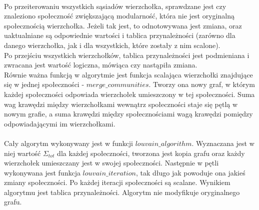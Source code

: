 \documentclass{article}
\begin{document}
\\
Po przeiterowaniu wszystkich sąsiadów wierzchołka, sprawdzane jest czy znaleziono społeczność zwiększającą modularność, która nie jest oryginalną społecznością wierzchołka. Jeżeli tak jest, to odnotowywana jest zmiana, oraz uaktualniane są odpowiednie wartości i tablica przynależności (zarówno dla danego wierzchołka, jak i dla wszystkich, które zostały z nim scalone).
\\
Po przejściu wszystkich wierzchołków, tablica przynależności jest podmieniana i zwracana jest wartość logiczna, mówiąca czy nastąpiła zmiana.  
\\
Równie ważna funkcją w algorytmie jest funkcja scalająca wierzchołki znajdujące się w jednej społeczności - $merge\_ communities$. Tworzy ona nowy graf, w którym każdej społeczności odpowiada wierzchołek umieszczony w tej społeczności. Suma wag krawędzi między wierzchołkami wewnątrz społeczności staje się pętlą w nowym grafie, a suma krawędzi między społecznościami wagą krawędzi pomiędzy odpowiadającymi im wierzchołkami.
\\ \\
Cały algorytm wykonywany jest w funkcji $louvain\_ algorithm$. Wyznaczana jest w niej wartość $\Sigma_{tot}$ dla każdej społeczności, tworzona jest kopia grafu oraz każdy wierzchołek umieszczany jest w swojej społeczności. Następnie w pętli wykonywana jest funkcja $louvain\_ iteration$, tak długo jak powoduje ona jakieś zmiany społeczności. Po każdej iteracji społeczności są scalane. Wynikiem algorytmu jest tablica przynależności. Algorytm nie modyfikuje oryginalnego grafu.
\end{document}
